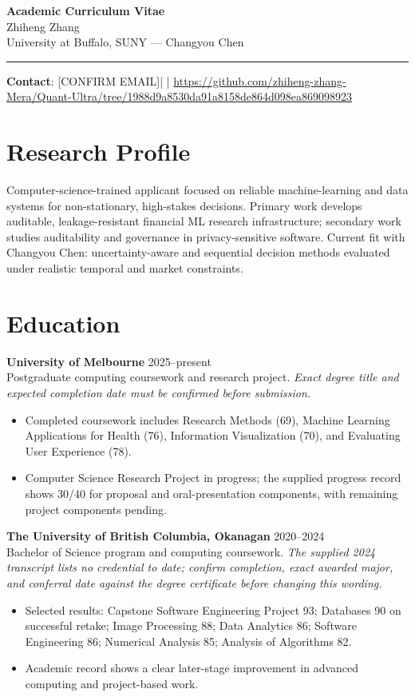 \documentclass[11pt]{article}
\newcommand{\ApplicantName}{Zhiheng Zhang}
\newcommand{\ApplicantEmail}{[CONFIRM EMAIL]}
\newcommand{\ApplicantPhone}{[CONFIRM PHONE]}
\newcommand{\ApplicantGitHub}{\url{https://github.com/zhiheng-zhang-Mera/Quant-Ultra/tree/1988d9a8530da91a8158de864d098ea869098923}}
\begin{document}
\begin{center}
{\LARGE\bfseries Academic Curriculum Vitae}\\[0.25em]
{\large \ApplicantName}\\
University at Buffalo, SUNY --- Changyou Chen
\end{center}
\vspace{0.35em}\hrule\vspace{0.65em}

\textbf{Contact}: \ApplicantEmail\quad | \quad \ApplicantPhone\quad | \quad \ApplicantGitHub

\section*{Research Profile}
Computer-science-trained applicant focused on reliable machine-learning and data systems for non-stationary, high-stakes decisions. Primary work develops auditable, leakage-resistant financial ML research infrastructure; secondary work studies auditability and governance in privacy-sensitive software. Current fit with Changyou Chen: uncertainty-aware and sequential decision methods evaluated under realistic temporal and market constraints.

\section*{Education}
\textbf{University of Melbourne} \hfill 2025--present\\
Postgraduate computing coursework and research project. \textit{Exact degree title and expected completion date must be confirmed before submission.}
\begin{itemize}
\item Completed coursework includes Research Methods (69), Machine Learning Applications for Health (76), Information Visualization (70), and Evaluating User Experience (78).
\item Computer Science Research Project in progress; the supplied progress record shows 30/40 for proposal and oral-presentation components, with remaining project components pending.
\end{itemize}

\textbf{The University of British Columbia, Okanagan} \hfill 2020--2024\\
Bachelor of Science program and computing coursework. \textit{The supplied 2024 transcript lists no credential to date; confirm completion, exact awarded major, and conferral date against the degree certificate before changing this wording.}
\begin{itemize}
\item Selected results: Capstone Software Engineering Project 93; Databases 90 on successful retake; Image Processing 88; Data Analytics 86; Software Engineering 86; Numerical Analysis 85; Analysis of Algorithms 82.
\item Academic record shows a clear later-stage improvement in advanced computing and project-based work.
\end{itemize}
\end{document}
